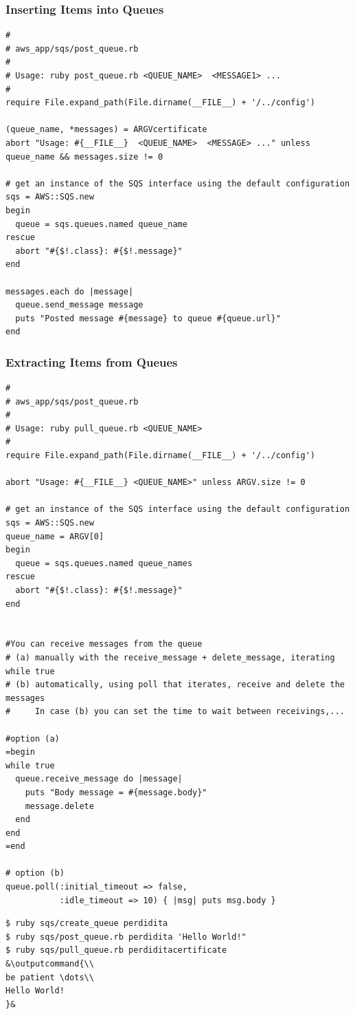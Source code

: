 \documentclass{beamer}
\newcommand{\outputcommand}[1]{\color{darkgreen}{#1}}
\begin{document}
\begin{frame}
\frametitle{Inserting Items into Queues}
\lstset{language=Ruby, style=eclipse}
\begin{lstlisting}[escapechar=&]
#
# aws_app/sqs/post_queue.rb
#
# Usage: ruby post_queue.rb <QUEUE_NAME>  <MESSAGE1> ...
#
require File.expand_path(File.dirname(__FILE__) + '/../config')

(queue_name, *messages) = ARGVcertificate
abort "Usage: #{__FILE__}  <QUEUE_NAME>  <MESSAGE> ..." unless queue_name && messages.size != 0

# get an instance of the SQS interface using the default configuration
sqs = AWS::SQS.new
begin
  queue = sqs.queues.named queue_name
rescue
  abort "#{$!.class}: #{$!.message}"
end

messages.each do |message|
  queue.send_message message
  puts "Posted message #{message} to queue #{queue.url}"
end
\end{lstlisting}
\end{frame}
\begin{frame}
\frametitle{Extracting Items from Queues}
\lstset{language=Ruby, style=eclipse}
\begin{lstlisting}[escapechar=&]
#
# aws_app/sqs/post_queue.rb
#
# Usage: ruby pull_queue.rb <QUEUE_NAME>
#
require File.expand_path(File.dirname(__FILE__) + '/../config')

abort "Usage: #{__FILE__} <QUEUE_NAME>" unless ARGV.size != 0

# get an instance of the SQS interface using the default configuration
sqs = AWS::SQS.new
queue_name = ARGV[0]
begin
  queue = sqs.queues.named queue_names
rescue
  abort "#{$!.class}: #{$!.message}"
end


#You can receive messages from the queue 
# (a) manually with the receive_message + delete_message, iterating while true
# (b) automatically, using poll that iterates, receive and delete the messages
#     In case (b) you can set the time to wait between receivings,...

#option (a)
=begin
while true
  queue.receive_message do |message|
    puts "Body message = #{message.body}"
    message.delete
  end
end
=end

# option (b)
queue.poll(:initial_timeout => false,
           :idle_timeout => 10) { |msg| puts msg.body }
\end{lstlisting}

\lstset{language=shell}
\begin{lstlisting}[escapechar=&]
$ ruby sqs/create_queue perdidita
$ ruby sqs/post_queue.rb perdidita 'Hello World!"
$ ruby sqs/pull_queue.rb perdiditacertificate
&\outputcommand{\\
be patient \dots\\
Hello World!
}&
\end{lstlisting}
\end{frame}
\end{document}
